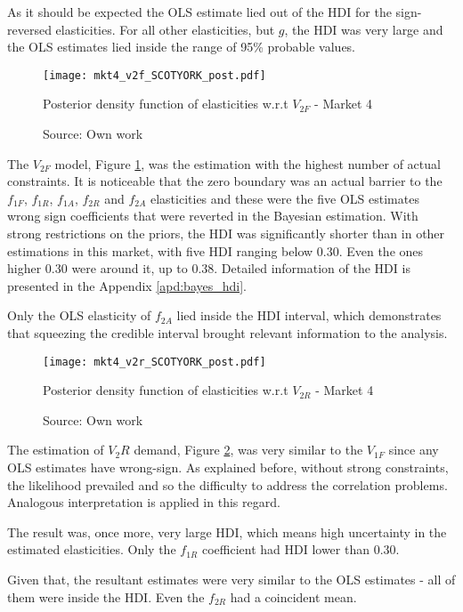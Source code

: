 As it should be expected the OLS estimate lied out of the HDI for the sign-reversed elasticities. For all other elasticities, but $g$, the HDI was very large and the OLS estimates lied inside the range of 95\% probable values.

\begin{figure}[H]
\centering
\texttt{[image: mkt4\_v2f\_SCOTYORK\_post.pdf]}
\caption{Posterior density function of elasticities w.r.t $V_{2F}$ - Market 4}
\label{fig:mkt4_v2f_SCOTYORK_post}
\caption*{Source: Own work}
\end{figure} 

The $V_{2F}$ model, Figure \ref{fig:mkt4_v2f_SCOTYORK_post}, was the estimation with the highest number of actual constraints. It is noticeable that the zero boundary was an actual barrier to the $f_{1F}$, $f_{1R}$, $f_{1A}$, $f_{2R}$ and $f_{2A}$ elasticities and these were the five OLS estimates wrong sign coefficients that were reverted in the Bayesian estimation.  With strong restrictions on the priors, the HDI was significantly shorter than in other estimations in this market, with five HDI ranging below 0.30. Even the ones higher 0.30 were around it, up to 0.38. Detailed information of the HDI is presented in the Appendix \ref{apd:bayes_hdi}. 

Only the OLS elasticity of $f_{2A}$ lied inside the HDI interval, which demonstrates that squeezing the credible interval brought relevant information to the analysis.

\begin{figure}[H]
\centering
\texttt{[image: mkt4\_v2r\_SCOTYORK\_post.pdf]}
\caption{Posterior density function of elasticities w.r.t $V_{2R}$ - Market 4}
\label{fig:mkt4_v2r_SCOTYORK_post}
\caption*{Source: Own work}
\end{figure} 

The estimation of $V_2R$ demand, Figure \ref{fig:mkt4_v2r_SCOTYORK_post}, was very similar to the $V_{1F}$ since any OLS estimates have wrong-sign. As explained before, without strong constraints, the likelihood prevailed and so the difficulty to address the correlation problems. Analogous interpretation is applied in this regard. 

The result was, once more, very large HDI, which means high uncertainty in the estimated elasticities. Only the $f_{1R}$ coefficient had HDI lower than 0.30. 

Given that, the resultant estimates were very similar to the OLS estimates - all of them were inside the HDI. Even the $f_{2R}$ had a coincident mean.

